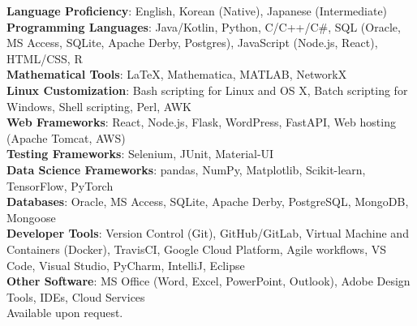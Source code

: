 

\textbf{Language Proficiency}: English, Korean (Native), Japanese (Intermediate)\\
\textbf{Programming Languages}: Java/Kotlin, Python, C/C++/C\#, 
SQL (Oracle, MS Access, SQLite, Apache Derby, Postgres), 
JavaScript (Node.js, React), HTML/CSS, R\\
\textbf{Mathematical Tools}: LaTeX, Mathematica, MATLAB, NetworkX\\
\textbf{Linux Customization}: Bash scripting for Linux and OS X, 
Batch scripting for Windows, Shell scripting, Perl, AWK\\
\textbf{Web Frameworks}: React, Node.js, Flask, WordPress, 
FastAPI, Web hosting (Apache Tomcat, AWS)\\
\textbf{Testing Frameworks}: Selenium, JUnit, Material-UI\\
\textbf{Data Science Frameworks}: pandas, NumPy, Matplotlib, Scikit-learn, TensorFlow, PyTorch\\
\textbf{Databases}: Oracle, MS Access, SQLite, Apache Derby, PostgreSQL, MongoDB, Mongoose\\
\textbf{Developer Tools}: Version Control (Git), 
GitHub/GitLab, Virtual Machine and Containers (Docker), 
TravisCI, Google Cloud Platform, Agile workflows, VS Code, 
Visual Studio, PyCharm, IntelliJ, Eclipse\\
\textbf{Other Software}: MS Office (Word, Excel, PowerPoint, Outlook), 
Adobe Design Tools, IDEs, Cloud Services\\





Available upon request.


